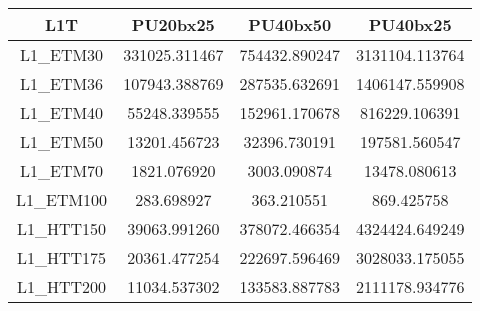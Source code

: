 
\begin{tabular}{|c||c|c|c|}
\hline
L1T & PU20bx25 & PU40bx50 & PU40bx25 \\
\hline \hline
L1\_ETM30 & 331025.311467 & 754432.890247 & 3131104.113764 \\
L1\_ETM36 & 107943.388769 & 287535.632691 & 1406147.559908 \\
L1\_ETM40 & 55248.339555 & 152961.170678 & 816229.106391 \\
L1\_ETM50 & 13201.456723 & 32396.730191 & 197581.560547 \\
L1\_ETM70 & 1821.076920 & 3003.090874 & 13478.080613 \\
L1\_ETM100 & 283.698927 & 363.210551 & 869.425758 \\
L1\_HTT150 & 39063.991260 & 378072.466354 & 4324424.649249 \\
L1\_HTT175 & 20361.477254 & 222697.596469 & 3028033.175055 \\
L1\_HTT200 & 11034.537302 & 133583.887783 & 2111178.934776 \\
\hline
\end{tabular}

